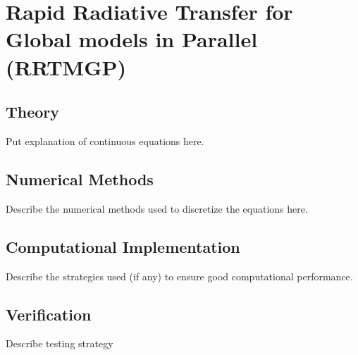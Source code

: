 \section{Rapid Radiative Transfer for Global models in Parallel (RRTMGP)}

\subsection{Theory}

Put explanation of continuous equations here.

\subsection{Numerical Methods}

Describe the numerical methods used to discretize the equations here.

\subsection{Computational Implementation}

Describe the strategies used (if any) to ensure good computational performance.

\subsection{Verification}

Describe testing strategy

